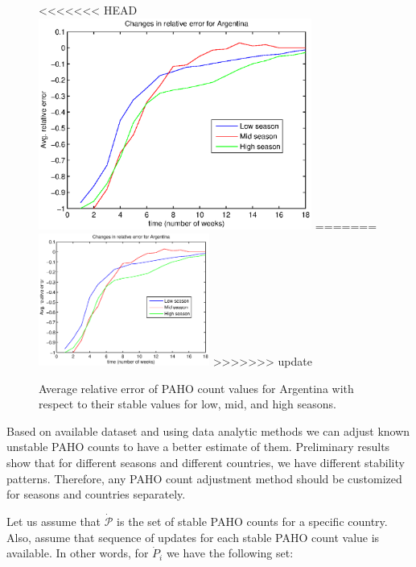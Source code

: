 \begin{figure}[h]
  \centering
<<<<<<< HEAD
    \includegraphics[width=0.8\textwidth]{fig/forpaper_seasonalAVGrelativeALLs_Argentina.eps}
=======
    \includegraphics[width=0.5\textwidth]{fig/forpaper_seasonalAVGrelativeALLs_Argentina.eps}
>>>>>>> update
  \caption{Average relative error of PAHO count values for Argentina with respect to their stable values for low, mid, and high seasons.}
  \label{fig:seasonal_relerrors}
\end{figure}  


Based on available dataset and using data analytic methods we can adjust known unstable PAHO counts to have a better estimate of them. Preliminary results show that for different seasons and different countries, we have different stability patterns. Therefore, any PAHO count adjustment method should be customized for seasons and countries separately. 

Let us assume that $\dot{\mathcal{P}}$ is the set of stable PAHO counts for a specific country. Also, assume that sequence of updates for each stable PAHO count value is available. In other words, for $\dot{P}_i$ we have the following set:
 
